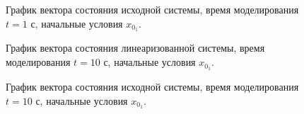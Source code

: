 \begin{figure}[!h]
\caption{График вектора состояния исходной системы, время моделирования $t=1$ с, начальные условия $x_{0_1}$.}
\label{2_x_nlin_01_sm}
\end{figure}

\begin{figure}[!h]
\caption{График вектора состояния линеаризованной системы, время моделирования $t=10$ с, начальные условия $x_{0_1}$.}
\label{2_x_lin_01_lg}
\end{figure}

\begin{figure}[!h]
\caption{График вектора состояния исходной системы, время моделирования $t=10$ с, начальные условия $x_{0_1}$.}
\label{2_x_nlin_01_lg}
\end{figure}

